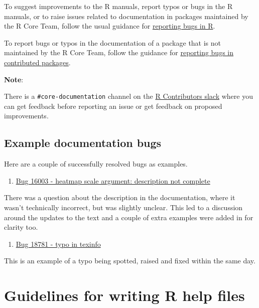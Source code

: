 \documentclass[
]{book}
\providecommand{\tightlist}{%
  \setlength{\itemsep}{0pt}\setlength{\parskip}{0pt}}
\begin{document}
To suggest improvements to the R manuals, report typos or bugs in the R manuals, or to raise issues related to documentation in packages maintained by the R Core Team, follow the usual guidance for \hyperref[RCorePkgBug]{reporting bugs in R}.

To report bugs or typos in the documentation of a package that is not maintained by the R Core Team, follow the guidance for \hyperref[nonRCorePkgBug]{reporting bugs in contributed packages}.

\textbf{Note}:

There is a \texttt{\#core-documentation} channel on the \href{https://r-contributors.slack.com/}{R Contributors slack} where you can get feedback before reporting an issue or get feedback on proposed improvements.

\subsection{Example documentation bugs}\label{example-documentation-bugs}

Here are a couple of successfully resolved bugs as examples.

\begin{enumerate}
\def\labelenumi{\arabic{enumi}.}
\tightlist
\item
  \href{https://bugs.r-project.org/show_bug.cgi?id=16003}{Bug 16003 - heatmap scale argument: description not complete}
\end{enumerate}

There was a question about the description in the documentation, where it wasn't technically incorrect, but was slightly unclear. This led to a discussion around the updates to the text and a couple of extra examples were added in for clarity too.

\begin{enumerate}
\def\labelenumi{\arabic{enumi}.}
\setcounter{enumi}{1}
\tightlist
\item
  \href{https://bugs.r-project.org/show_bug.cgi?id=18781}{Bug 18781 - typo in texinfo}
\end{enumerate}

This is an example of a typo being spotted, raised and fixed within the same day.

\section{Guidelines for writing R help files}\label{guidelines-for-writing-r-help-files}
\end{document}
